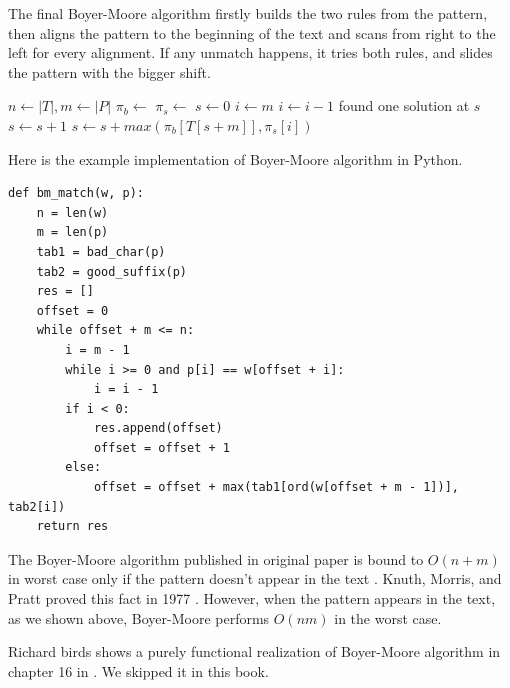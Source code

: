 \documentclass[UTF8]{article}
\begin{document}
The final Boyer-Moore algorithm firstly builds the two rules from the pattern, then
aligns the pattern to the beginning of the text and scans from right to the left for
every alignment. If any unmatch happens, it tries both rules, and slides the pattern
with the bigger shift.

\begin{algorithmic}[1]
  \State $n \gets |T|, m \gets |P|$
  \State $\pi_b \gets$ 
  \State $\pi_s \gets$ 
  \State $s \gets 0$
    \State $i \gets m$
      \State $i \gets i - 1$
    \EndWhile
      \State found one solution at $s$
      \State $s \gets s + 1$ 
    \Else
      \State $s \gets s + max(\pi_b[T[s + m]], \pi_s[i])$
    \EndIf
  \EndWhile
\EndFunction
\end{algorithmic}

Here is the example implementation of Boyer-Moore algorithm in Python.

\lstset{language=Python}
\begin{lstlisting}
def bm_match(w, p):
    n = len(w)
    m = len(p)
    tab1 = bad_char(p)
    tab2 = good_suffix(p)
    res = []
    offset = 0
    while offset + m <= n:
        i = m - 1
        while i >= 0 and p[i] == w[offset + i]:
            i = i - 1
        if i < 0:
            res.append(offset)
            offset = offset + 1
        else:
            offset = offset + max(tab1[ord(w[offset + m - 1])], tab2[i])
    return res
\end{lstlisting}

The Boyer-Moore algorithm published in original paper is bound to $O(n+m)$ in worst case only
if the pattern doesn't appear in the text \cite{boyer-moore}. Knuth, Morris, and Pratt proved
this fact in 1977 \cite{wiki-boyer-moore}. However, when the pattern appears in the text, as
we shown above, Boyer-Moore performs $O(nm)$ in the worst case.

Richard birds shows a purely functional realization of Boyer-Moore algorithm in chapter 16 in
\cite{fp-pearls}. We skipped it in this book.
\end{document}
